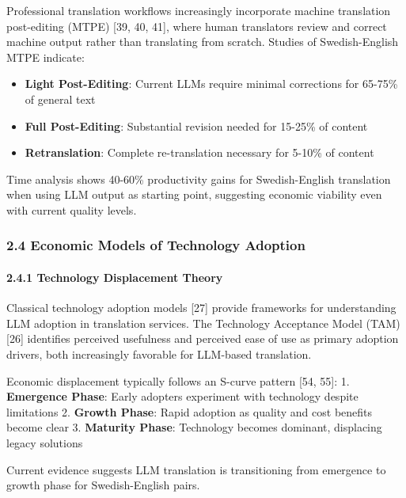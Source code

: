 \documentclass[12pt,a4paper]{article}
\providecommand{\tightlist}{%
  \setlength{\itemsep}{0pt}\setlength{\parskip}{0pt}}
\begin{document}
{Professional translation workflows increasingly incorporate machine
translation post-editing (MTPE) {[}39, 40, 41{]}, where human
translators review and correct machine output rather than translating
from scratch. Studies of Swedish-English MTPE indicate:

\begin{itemize}
\tightlist
\item
  \textbf{Light Post-Editing}: Current LLMs require minimal corrections
  for 65-75\% of general text
\item
  \textbf{Full Post-Editing}: Substantial revision needed for 15-25\% of
  content
\item
  \textbf{Retranslation}: Complete re-translation necessary for 5-10\%
  of content
\end{itemize}

Time analysis shows 40-60\% productivity gains for Swedish-English
translation when using LLM output as starting point, suggesting economic
viability even with current quality levels.

\hypertarget{economic-models-of-technology-adoption}{%
\subsubsection{2.4 Economic Models of Technology
Adoption}\label{economic-models-of-technology-adoption}}

\hypertarget{technology-displacement-theory}{%
\paragraph{2.4.1 Technology Displacement
Theory}\label{technology-displacement-theory}}

Classical technology adoption models {[}27{]} provide frameworks for
understanding LLM adoption in translation services. The Technology
Acceptance Model (TAM) {[}26{]} identifies perceived usefulness and
perceived ease of use as primary adoption drivers, both increasingly
favorable for LLM-based translation.

Economic displacement typically follows an S-curve pattern {[}54, 55{]}:
1. \textbf{Emergence Phase}: Early adopters experiment with technology
despite limitations 2. \textbf{Growth Phase}: Rapid adoption as quality
and cost benefits become clear 3. \textbf{Maturity Phase}: Technology
becomes dominant, displacing legacy solutions

Current evidence suggests LLM translation is transitioning from
emergence to growth phase for Swedish-English pairs.

}
\end{document}
